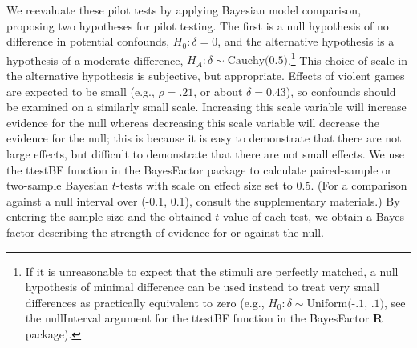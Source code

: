 \documentclass[man]{apa6}
\begin{document}
We reevaluate these pilot tests by applying Bayesian model comparison, proposing two hypotheses for pilot testing. The first is a null hypothesis of no difference in potential confounds, $H_0: \delta{} = 0$, and the alternative hypothesis is a hypothesis of a moderate difference, $H_A: \delta{} \sim{} \mbox{Cauchy(0.5)}$.\footnote{If it is unreasonable to expect that the stimuli are perfectly matched, a null hypothesis of minimal difference can be used instead to treat very small differences as practically equivalent to zero (e.g., $H_0: \delta{} \sim{} \mbox{Uniform(-.1, .1)}$, see the nullInterval argument for the ttestBF function in the BayesFactor {\bf R} package).} This choice of scale in the alternative hypothesis is subjective, but appropriate. Effects of violent games are expected to be small (e.g., $\rho = .21$, or about $\delta = 0.43$), so confounds should be examined on a similarly small scale. Increasing this scale variable will increase evidence for the null whereas decreasing this scale variable will decrease the evidence for the null; this is because it is easy to demonstrate that there are not large effects, but difficult to demonstrate that there are not small effects. %
We use the ttestBF function in the BayesFactor package \citep{Morey:Rouder:2014} to calculate paired-sample or two-sample Bayesian $t$-tests with scale on effect size set to 0.5. (For a comparison against a null interval over (-0.1, 0.1), consult the supplementary materials.)
By entering the sample size and the obtained $t$-value of each test, we obtain a Bayes factor describing the strength of evidence for or against the null.  
\end{document}
